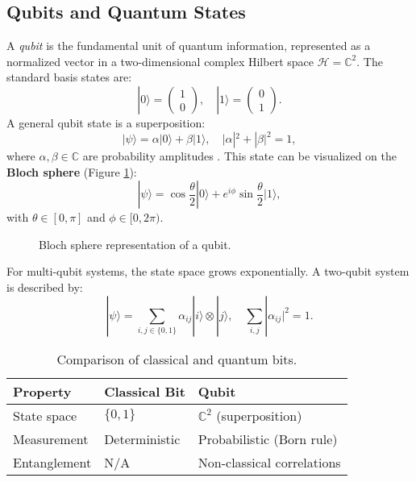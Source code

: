 \subsection{Qubits and Quantum States}
\label{subsec:qubits}

A \textit{qubit} is the fundamental unit of quantum information, represented as a normalized vector in a two-dimensional complex Hilbert space $\mathcal{H} = \mathbb{C}^2$. The standard basis states are:
\[
|0\rangle = \begin{pmatrix} 1 \\ 0 \end{pmatrix}, \quad |1\rangle = \begin{pmatrix} 0 \\ 1 \end{pmatrix}.
\]
A general qubit state is a superposition:
\[
|\psi\rangle = \alpha|0\rangle + \beta|1\rangle, \quad |\alpha|^2 + |\beta|^2 = 1,
\]
where $\alpha, \beta \in \mathbb{C}$ are probability amplitudes \cite{nielsen2010quantum}. This state can be visualized on the \textbf{Bloch sphere} (Figure \ref{fig:bloch_sphere}):
\[
|\psi\rangle = \cos\frac{\theta}{2}|0\rangle + e^{i\phi}\sin\frac{\theta}{2}|1\rangle,
\]
with $\theta \in [0, \pi]$ and $\phi \in [0, 2\pi)$.

\begin{figure}[h]
\centering
{}
\caption{Bloch sphere representation of a qubit.}
\label{fig:bloch_sphere}
\end{figure}

For multi-qubit systems, the state space grows exponentially. A two-qubit system is described by:
\[
|\psi\rangle = \sum_{i,j \in \{0,1\}} \alpha_{ij}|i\rangle \otimes |j\rangle, \quad \sum_{i,j} |\alpha_{ij}|^2 = 1.
\]

\begin{table}[h]
\centering
\caption{Comparison of classical and quantum bits.}
\label{tab:qubit_vs_bit}
\begin{tabular}{|l|l|l|}
\hline
\textbf{Property} & \textbf{Classical Bit} & \textbf{Qubit} \\ \hline
State space       & $\{0, 1\}$            & $\mathbb{C}^2$ (superposition) \\ \hline
Measurement       & Deterministic         & Probabilistic (Born rule) \\ \hline
Entanglement      & N/A                   & Non-classical correlations \\ \hline
\end{tabular}
\end{table}